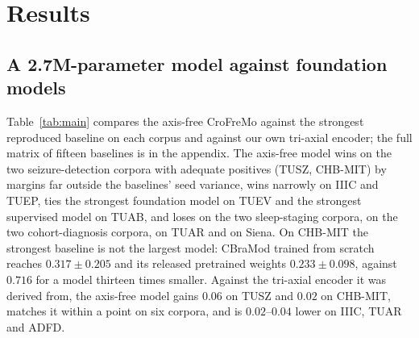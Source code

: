 \section{Results}
\label{sec:results}

\subsection{A 2.7M-parameter model against foundation models}
\label{sec:main}

Table~\ref{tab:main} compares the axis-free CroFreMo against the strongest
reproduced baseline on each corpus and against our own tri-axial encoder;
the full matrix of fifteen baselines is in the appendix. The axis-free
model wins on the two seizure-detection corpora with adequate positives
(TUSZ, CHB-MIT) by margins far outside the baselines' seed variance, wins
narrowly on IIIC and TUEP, ties the strongest foundation model on TUEV and
the strongest supervised model on TUAB, and loses on the two sleep-staging
corpora, on the two cohort-diagnosis corpora, on TUAR and on Siena. On
CHB-MIT the strongest baseline is not the largest model: CBraMod trained
from scratch reaches $0.317 \pm 0.205$ and its released pretrained weights
$0.233 \pm 0.098$, against $0.716$ for a model thirteen times smaller.
Against the tri-axial encoder it was derived from, the axis-free model
gains $0.06$ on TUSZ and $0.02$ on CHB-MIT, matches it within a point on
six corpora, and is $0.02$--$0.04$ lower on IIIC, TUAR and ADFD.

